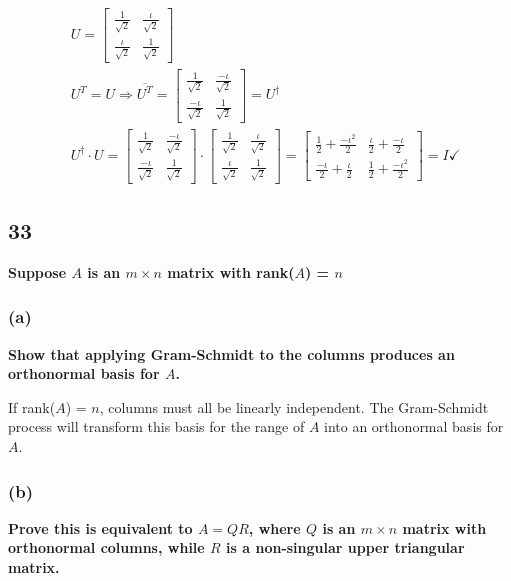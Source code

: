 \documentclass[10pt,letterpaper]{article}
\begin{document}
	\begin{align*}
	&U = \begin{bmatrix}
	\frac{1}{\sqrt{2}} & \frac{\iota}{\sqrt{2}} \\ \frac{\iota}{\sqrt{2}} & \frac{1}{\sqrt{2}} 
	\end{bmatrix} \\ 
	& U^T = U \Rightarrow \overline{U^T} = \begin{bmatrix}
	\frac{1}{\sqrt{2}} & \frac{-\iota}{\sqrt{2}} \\ \frac{-\iota}{\sqrt{2}} & \frac{1}{\sqrt{2}} 
	\end{bmatrix} = U^{\dagger} \\ 
	& U^{\dagger} \cdot U = \begin{bmatrix}
	\frac{1}{\sqrt{2}} & \frac{-\iota}{\sqrt{2}} \\ \frac{-\iota}{\sqrt{2}} & \frac{1}{\sqrt{2}} 
	\end{bmatrix} \cdot \begin{bmatrix}
	\frac{1}{\sqrt{2}} & \frac{\iota}{\sqrt{2}} \\ \frac{\iota}{\sqrt{2}} & \frac{1}{\sqrt{2}} 
	\end{bmatrix} = \begin{bmatrix}
	\frac{1}{2} + \frac{-\iota^2}{2} & \frac{\iota}{2} + \frac{-\iota}{2} \\
	\frac{- \iota}{2} + \frac{\iota}{2} & \frac{1}{2} + \frac{-\iota^2}{2}
	\end{bmatrix} = I \checkmark
	\end{align*}
	\subsection*{33} \textbf{Suppose $A$ is an $m \times n$ matrix with rank($A$) = $n$}
	\subsubsection*{(a)} \textbf{Show that applying Gram-Schmidt to the columns produces an orthonormal basis for $A$.}
	
	If rank($A$) = $n$, columns must all be linearly independent. The Gram-Schmidt process will transform this basis for the range of $A$ into an orthonormal basis for $A$. 
	
	\subsubsection*{(b)} \textbf{Prove this is equivalent to $A=QR$, where $Q$ is an $m \times n$ matrix with orthonormal columns, while $R$ is a non-singular upper triangular matrix. } 
	
\end{document}
